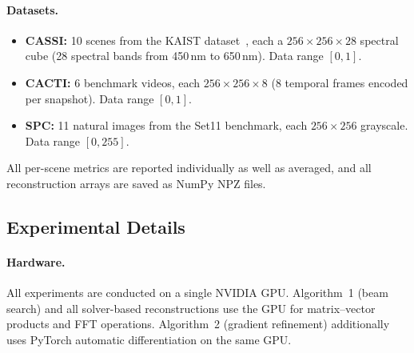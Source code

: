 \documentclass[11pt]{article}
\begin{document}
\paragraph{Datasets.}
\begin{itemize}
  \item \textbf{CASSI:} 10 scenes from the KAIST dataset~\cite{choi2017kaist},
    each a $256 \times 256 \times 28$ spectral cube (28 spectral bands
    from 450\,nm to 650\,nm).  Data range $[0, 1]$.
  \item \textbf{CACTI:} 6 benchmark videos, each $256 \times 256 \times 8$
    (8 temporal frames encoded per snapshot).  Data range $[0, 1]$.
  \item \textbf{SPC:} 11 natural images from the Set11 benchmark, each
    $256 \times 256$ grayscale.  Data range $[0, 255]$.
\end{itemize}

\noindent All per-scene metrics are reported individually as well as
averaged, and all reconstruction arrays are saved as NumPy NPZ files.


\subsection*{Experimental Details}
\label{sec:methods:experimental}

\paragraph{Hardware.}
All experiments are conducted on a single NVIDIA GPU.  Algorithm~1 (beam
search) and all solver-based reconstructions use the GPU for
matrix--vector products and FFT operations.  Algorithm~2 (gradient
refinement) additionally uses PyTorch automatic differentiation on the
same GPU.
\end{document}
